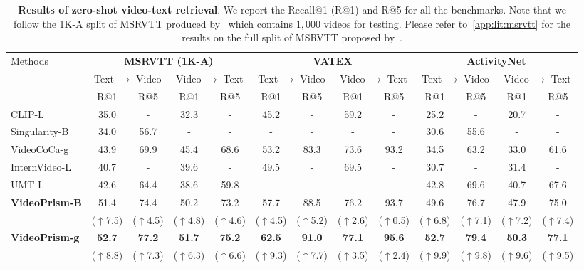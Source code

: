 \documentclass{article}
\theoremstyle{plain}
\theoremstyle{definition}
\theoremstyle{remark}
\newcommand{\OURS}{VideoPrism\xspace}
\newcommand{\upcolor}[1]{\textcolor{vpblue}{($\uparrow$#1)}}
\begin{document}
\begin{table}[t]
\caption{\textbf{Results of zero-shot video-text retrieval}. We report the Recall@1 (R@1) and R@5 for all the benchmarks. Note that we follow the 1K-A split of MSRVTT produced by~\citet{bain2021frozen} which contains $1,000$ videos for testing. Please refer to~\cref{app:lit:msrvtt} for the results on the full split of MSRVTT proposed by~\citet{xu2016msr}.}
\label{tbl:zs_retrieval}
\begin{center}
\begin{scriptsize}
\begin{tabular}{@{}l|cccc|cccc|cccc@{}}
    \toprule
    \multirow{3}{*}{Methods} & \multicolumn{4}{c|}{\textbf{MSRVTT (1K-A)}} & \multicolumn{4}{c|}{\textbf{VATEX}} & \multicolumn{4}{c}{\textbf{ActivityNet}} \\
    & \multicolumn{2}{c}{Text $\rightarrow$ Video} & \multicolumn{2}{c|}{Video $\rightarrow$ Text} & \multicolumn{2}{c}{Text $\rightarrow$ Video} & \multicolumn{2}{c|}{Video $\rightarrow$ Text} & \multicolumn{2}{c}{Text $\rightarrow$ Video} & \multicolumn{2}{c}{Video $\rightarrow$ Text} \\
    & R@1 & R@5 & R@1 & R@5 & R@1 & R@5 & R@1 & R@5 & R@1 & R@5 & R@1 & R@5 \\
    \midrule
    CLIP-L~\cite{radford2021learning} & 35.0 & - & 32.3 & - & 45.2 & - & 59.2 & - & 25.2 & - & 20.7 & - \\
    Singularity-B~\cite{lei2022revealing} & 34.0 & 56.7 & - & - & - & - & - & - & 30.6 & 55.6 & - & - \\
    VideoCoCa-g~\cite{yan2022videococa} & 43.9 & 69.9 & 45.4 & 68.6 & 53.2 & 83.3 & 73.6 & 93.2 & 34.5 & 63.2 & 33.0 & 61.6 \\
    InternVideo-L~\cite{wang2022internvideo} & 40.7 & - & 39.6 & - & 49.5 & - & 69.5 & - & 30.7 & - & 31.4 & - \\
    UMT-L~\cite{li2023unmasked} & 42.6 & 64.4 & 38.6 & 59.8 & - & - & - & - & 42.8 & 69.6 & 40.7 & 67.6 \\
\midrule
    \multirow{2}{*}{\textbf{\OURS-B}} & 51.4 & 74.4 & 50.2 & 73.2 & 57.7 & 88.5 & 76.2 & 93.7 & 49.6 & 76.7 & 47.9 & 75.0 \\
    & \upcolor{7.5} & \upcolor{4.5} & \upcolor{4.8} & \upcolor{4.6} & \upcolor{4.5} & \upcolor{5.2} & \upcolor{2.6} & \upcolor{0.5} & \upcolor{6.8} & \upcolor{7.1} & \upcolor{7.2} & \upcolor{7.4} \\
    \hline
    \multirow{2}{*}{\textbf{\OURS-g}} & \textbf{52.7} & \textbf{77.2} & \textbf{51.7} & \textbf{75.2} & \textbf{62.5} & \textbf{91.0} & \textbf{77.1} & \textbf{95.6} & \textbf{52.7} & \textbf{79.4} & \textbf{50.3} & \textbf{77.1} \\
    & \upcolor{8.8} & \upcolor{7.3} & \upcolor{6.3} & \upcolor{6.6} & \upcolor{9.3} & \upcolor{7.7} & \upcolor{3.5} & \upcolor{2.4} & \upcolor{9.9} & \upcolor{9.8} & \upcolor{9.6} & \upcolor{9.5} \\
    \bottomrule
\end{tabular}
\end{scriptsize}
\end{center}
\vskip -0.1in
\end{table}
\end{document}
